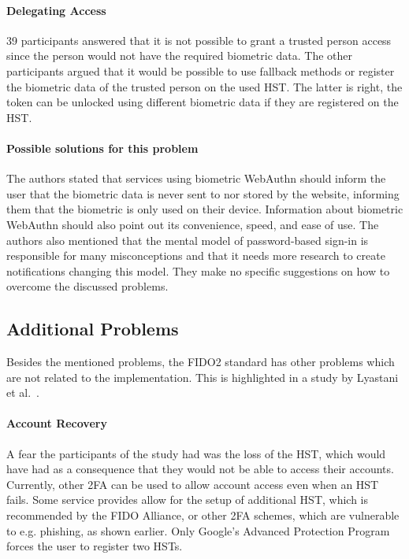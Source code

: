 \documentclass[runningheads]{llncs}
\begin{document}
\paragraph{Delegating Access}
39 participants answered that it is not possible to grant a trusted person access since the person would not have the required biometric data. The other participants argued that it would be possible to use fallback methods or register the biometric data of the trusted person on the used HST. The latter is right, the token can be unlocked using different biometric data if they are registered on the HST.

\paragraph{Possible solutions for this problem}
The authors stated that services using biometric WebAuthn should inform the user that the biometric data is never sent to nor stored by the website, informing them that the biometric is only used on their device. Information about biometric WebAuthn should also point out its convenience, speed, and ease of use. The authors also mentioned that the mental model of password-based sign-in is responsible for many misconceptions and that it needs more research to create notifications changing this model. They make no specific suggestions on how to overcome the discussed problems.

\subsection{Additional Problems} \label{ref1}
Besides the mentioned problems, the FIDO2 standard has other problems which are not related to the implementation. This is highlighted in a study by Lyastani et al.~\cite{9152694}. 

\paragraph{Account Recovery}
A fear the participants of the study had was the loss of the HST, which would have had as a consequence that they would not be able to access their accounts. Currently, other 2FA can be used to allow account access even when an HST fails. Some service provides allow for the setup of additional HST, which is recommended by the FIDO Alliance, or other 2FA schemes, which are vulnerable to e.g. phishing, as shown earlier. Only Google's Advanced Protection Program forces the user to register two HSTs.
\end{document}
